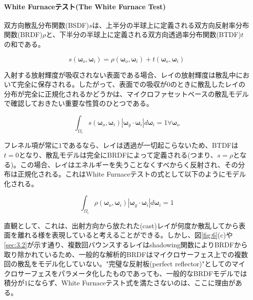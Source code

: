 \documentclass[a4j,xelatex,ja=standard]{bxjsarticle}
\begin{document}
\paragraph{White Furnaceテスト(The White Furnace Test)}

双方向散乱分布関数(BSDF)$s$は、上半分の半球上に定義される双方向反射率分布関数(BRDF)$\rho$と、下半分の半球上に定義される双方向透過率分布関数(BTDF)$t$の和である。

\begin{equation}
    s(\boldsymbol{\omega}_o, \boldsymbol{\omega}_i) = \rho(\boldsymbol{\omega}_o, \boldsymbol{\omega}_i) + t(\boldsymbol{\omega}_o, \boldsymbol{\omega}_i)
    \label{eq:32}
\end{equation}

入射する放射輝度が吸収されない表面である場合、レイの放射輝度は散乱中において完全に保存される。したがって、表面での吸収が$0$のときに散乱したレイの分布が完全に正規化されるかどうかは、マイクロファセットベースの散乱モデルで確認しておきたい重要な性質のひとつである。

\begin{equation}
    \int_{\Omega_i} s(\boldsymbol{\omega}_o, \boldsymbol{\omega}_i) |\boldsymbol{\omega}_g \cdot \boldsymbol{\omega}_i| d\boldsymbol{\omega}_i = 1 \forall \boldsymbol{\omega}_o
    \label{eq:33}
\end{equation}

フレネル項が常に$1$であるなら、レイは透過が一切起こらないため、BTDFは$t = 0$となり、散乱モデルは完全にBRDFによって定義される(つまり、$s = \rho$となる)。この場合、レイはエネルギーを失うことなくすべからく反射され、その分布は正規化される。これはWhite Furnaceテストの式として以下のようにモデル化される。

\begin{equation}
    \int_{\Omega_i} \rho(\boldsymbol{\omega}_o, \boldsymbol{\omega}_i) |\boldsymbol{\omega}_g \cdot \boldsymbol{\omega}_i| d\boldsymbol{\omega}_i = 1
    \label{eq:34}
\end{equation}

直観として、これは、出射方向から放たれた(cast)レイが何度か散乱してから表面を離れる様を表現していると考えることができる。しかし、図\ref{fig:6}(c)や\ref{sec:3.2}が示す通り、複数回バウンスするレイはshadowing関数によりBRDFから取り除かれているため、一般的な解析的BRDFはマイクロサーフェス上での複数回の散乱をモデル化していない。"完璧な反射板(perfect reflector)"としてのマイクロサーフェスをパラメータ化したものであっても、一般的なBRDFモデルでは積分が$1$にならず、White Furnaceテスト式を満たさないのは、ここに理由がある。
\end{document}
